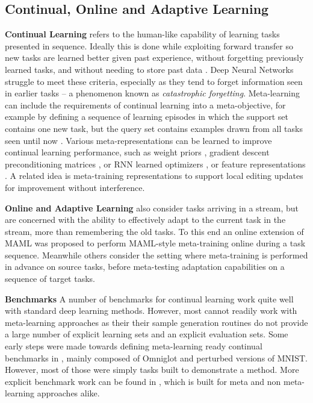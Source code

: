 \documentclass[10pt,journal,compsoc]{IEEEtran}
\newcommand{\keypoint}[1]{\vspace{0.1cm}\noindent\textbf{#1}\quad}
\begin{document}
\subsection{Continual, Online and Adaptive Learning}
\keypoint{Continual Learning} refers to the human-like capability of learning tasks presented in sequence. Ideally this is done while exploiting forward transfer so new tasks are learned better given past experience, without forgetting previously learned tasks, and without needing to store past data \cite{chen2018lifelong}. Deep Neural Networks struggle to meet these criteria, especially as they tend to forget information seen in earlier tasks -- a phenomenon known as \emph{catastrophic forgetting}. Meta-learning can include the requirements of continual learning into a meta-objective, for example by defining a sequence of learning episodes in which the support set contains one new task, but the query set contains examples drawn from all tasks seen until now \cite{vuorio2018meta,flennerhag2020warpgrad}. Various meta-representations can be learned to improve continual learning performance, such as weight priors \cite{ren2019incremental}, gradient descent preconditioning matrices \cite{flennerhag2020warpgrad}, or RNN learned optimizers \cite{vuorio2018meta}, or feature representations \cite{javed2019meta}. A related idea is meta-training representations to support local editing updates \cite{sinitsin2020editable} for improvement without interference. 

\keypoint{Online and Adaptive Learning} also consider tasks arriving in a stream, but are concerned with the ability to effectively adapt to the current task in the stream, more than remembering the old tasks. To this end an online extension of MAML was proposed \cite{finn2019online} to perform MAML-style meta-training online during a task sequence. Meanwhile others \cite{ritter2018episodicmeta,alshedivat2018nonstationarymeta,clavera2019learning} consider the setting where meta-training is performed in advance on source tasks, before meta-testing adaptation capabilities on a sequence of target tasks.

\keypoint{Benchmarks}
A number of benchmarks for continual learning work quite well with standard deep learning methods. However, most cannot readily work with meta-learning approaches as their their sample generation routines do not provide a large number of explicit learning sets and an explicit evaluation sets. Some early steps were made towards defining meta-learning ready continual benchmarks in \cite{finn2019online,vuorio2018meta,javed2019meta}, mainly composed of Omniglot and perturbed versions of MNIST. However, most of those were simply tasks built to demonstrate a method. More explicit benchmark work can be found in \cite{antoniou2020defining}, which is built for meta and non meta-learning approaches alike.
\end{document}
